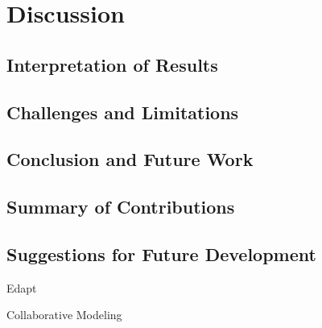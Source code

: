 \chapter{Discussion}
  \label{sec:discussion}

  \section{Interpretation of Results}
  \label{subsec:interpretation-results}

  \section{Challenges and Limitations}
  \label{subsec:challenges-limitations}

  \section{Conclusion and Future Work}
  \label{sec:conclusion}

  \section{Summary of Contributions}
  \label{subsec:summary-contributions}

  \section{Suggestions for Future Development}
  \label{subsec:suggestions-future-development}

  Edapt

  Collaborative Modeling
